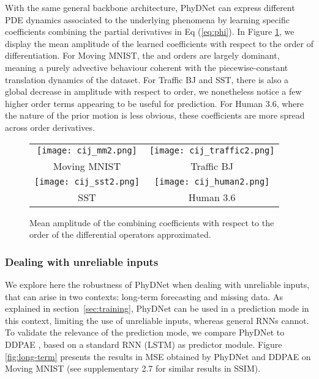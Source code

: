 \documentclass[10pt,twocolumn,letterpaper]{article}
\begin{document}
With the same general backbone architecture, PhyDNet can express different PDE dynamics associated to the underlying phenomena by learning specific  coefficients combining the partial derivatives in Eq (\ref{eq:phi}). In Figure \ref{fig:cij}, we display the mean amplitude of the learned coefficients  with respect to the order of differentiation. For Moving MNIST, the  and  orders are largely dominant, meaning a purely advective behaviour coherent with the piecewise-constant translation dynamics of the dataset. For Traffic BJ and SST, there is also a global decrease in amplitude with respect to order, we nonetheless notice a few higher order terms appearing to be useful for prediction. 
For Human 3.6, where the nature of the prior motion is less obvious, these coefficients are more spread across order derivatives.
\vspace{-0.2cm}
\begin{figure}[H]
    \centering
\begin{tabular}{cc}


   \hspace{-0.5cm} \texttt{[image: cij\_mm2.png]}      & \hspace{-0.5cm}
    \texttt{[image: cij\_traffic2.png]}  \\ 
    Moving MNIST & Traffic BJ \\  \hspace{-0.5cm}
    \texttt{[image: cij\_sst2.png]}     & \hspace{-0.5cm} \texttt{[image: cij\_human2.png]} \\
   SST  & Human 3.6

    
    \end{tabular}{}
    \caption{Mean amplitude of the combining coefficients  with respect to the  order of the differential operators approximated.}
    \label{fig:cij}
\end{figure}

\vspace{-0.5cm}
\subsubsection{Dealing with unreliable inputs} 
\label{sec:lt-forecasting}

We explore here the robustness of PhyDNet when dealing with unreliable inputs, that can arise in two contexts: long-term forecasting and missing data. 
As explained in section~\ref{sec:training}, PhyDNet can be used in a prediction mode in this context, limiting the use of unreliable inputs, whereas general RNNs cannot. To validate the relevance of the prediction mode, we compare PhyDNet to DDPAE \cite{hsieh2018learning}, based on a standard RNN (LSTM) as predictor module. 
Figure \ref{fig:long-term} presents the results in MSE obtained by PhyDNet and DDPAE on Moving MNIST (see supplementary 2.7 for similar results in SSIM).
\end{document}
